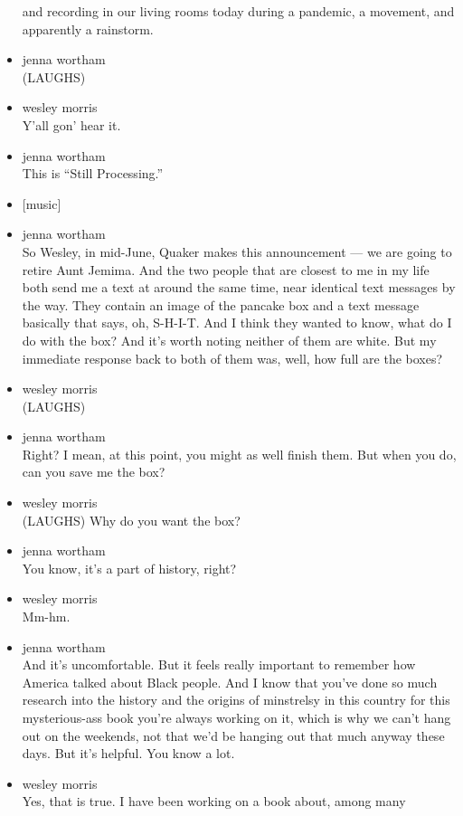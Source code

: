 \begin{itemize}
  and recording in our living rooms today during a pandemic, a movement,
  and apparently a rainstorm.
\item
  jenna wortham\\
  (LAUGHS)
\item
  wesley morris\\
  Y'all gon' hear it.
\item
  jenna wortham\\
  This is ``Still Processing.''
\item
  {[}music{]}
\item
  jenna wortham\\
  So Wesley, in mid-June, Quaker makes this announcement --- we are
  going to retire Aunt Jemima. And the two people that are closest to me
  in my life both send me a text at around the same time, near identical
  text messages by the way. They contain an image of the pancake box and
  a text message basically that says, oh, S-H-I-T. And I think they
  wanted to know, what do I do with the box? And it's worth noting
  neither of them are white. But my immediate response back to both of
  them was, well, how full are the boxes?
\item
  wesley morris\\
  (LAUGHS)
\item
  jenna wortham\\
  Right? I mean, at this point, you might as well finish them. But when
  you do, can you save me the box?
\item
  wesley morris\\
  (LAUGHS) Why do you want the box?
\item
  jenna wortham\\
  You know, it's a part of history, right?
\item
  wesley morris\\
  Mm-hm.
\item
  jenna wortham\\
  And it's uncomfortable. But it feels really important to remember how
  America talked about Black people. And I know that you've done so much
  research into the history and the origins of minstrelsy in this
  country for this mysterious-ass book you're always working on it,
  which is why we can't hang out on the weekends, not that we'd be
  hanging out that much anyway these days. But it's helpful. You know a
  lot.
\item
  wesley morris\\
  Yes, that is true. I have been working on a book about, among many

\end{itemize}

